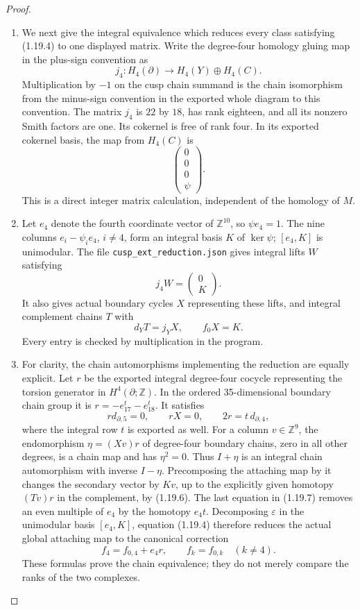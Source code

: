 \documentclass[11pt,a4paper]{article}
\theoremstyle{definition}
\begin{document}
\begin{proof}
\begin{enumerate}[label=\arabic*.]
\item We next give the integral equivalence which reduces every class
satisfying (1.19.4) to one displayed matrix.  Write the degree-four
homology gluing map in the plus-sign convention as
\[
 j_4:H_4(\partial)\longrightarrow H_4(Y)\oplus H_4(C).
\]
Multiplication by $-1$ on the cusp chain summand is the chain
isomorphism from the minus-sign convention in the exported whole
diagram to this convention.  The matrix $j_4$ is $22$ by $18$,
has rank eighteen, and all its nonzero Smith factors are one.
Its cokernel is free of rank four. In its exported cokernel basis,
the map from $H_4(C)$ is
\[
 \begin{pmatrix}0\\0\\0\\\psi\end{pmatrix}.
\tag{1.19.5}
\]
This is a direct integer matrix calculation, independent of the
homology of $M$.

\item Let $e_4$ denote the fourth coordinate vector of $\mathbb Z^{10}$,
so $\psi e_4=1$.  The nine columns
$e_i-\psi_i e_4$, $i\ne4$, form an integral basis $K$ of $\ker\psi$;
$[e_4,K]$ is unimodular.  The file
\texttt{cusp\_ext\_reduction.json} gives integral lifts $W$ satisfying
\[
 j_4W=\begin{pmatrix}0\\K\end{pmatrix}.
\]
It also gives actual boundary cycles $X$ representing these lifts,
and integral complement chains $T$ with
\[
 d_YT=j_YX,\qquad f_0X=K.
\tag{1.19.6}
\]
Every entry is checked by multiplication in the program.

\item For clarity, the chain automorphisms implementing the reduction
are equally explicit.  Let $r$ be the exported integral degree-four
cocycle representing the torsion generator in $H^4(\partial;\mathbb Z)$.
In the ordered 35-dimensional boundary chain group it is
$r=-e_{17}^{t}-e_{18}^{t}$.  It satisfies
\[
 r d_{\partial,5}=0,\qquad rX=0,
 \qquad 2r=t\,d_{\partial,4},
\tag{1.19.7}
\]
where the integral row $t$ is exported as well.
For a column $v\in\mathbb Z^9$, the endomorphism
$\eta=(Xv)r$ of degree-four boundary chains, zero in all other
degrees, is a chain map and has $\eta^2=0$.
Thus $I+\eta$ is an integral chain automorphism with inverse
$I-\eta$. Precomposing the attaching map by it changes the
secondary vector by $Kv$, up to the explicitly given homotopy
$(Tv)r$ in the complement, by (1.19.6).
The last equation in (1.19.7) removes an even multiple of $e_4$
by the homotopy $e_4t$.  Decomposing $\varepsilon$ in the
unimodular basis $[e_4,K]$, equation (1.19.4) therefore reduces
the actual global attaching map to the canonical correction
\[
 f_4=f_{0,4}+e_4r,
 \qquad f_k=f_{0,k}\quad(k\ne4).
\tag{1.19.8}
\]
These formulas prove the chain equivalence; they do not merely
compare the ranks of the two complexes.


\end{enumerate}
\end{proof}
\end{document}
